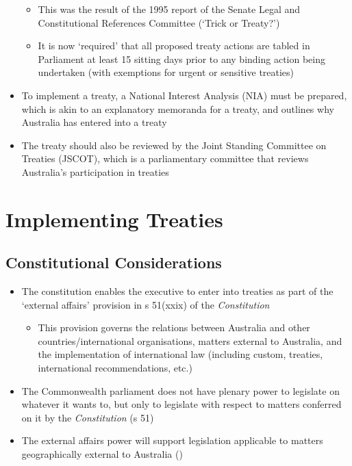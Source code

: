 \begin{itemize}
\begin{itemize}
        \item This was the result of the 1995 report of the Senate Legal and Constitutional References Committee (`Trick or Treaty?')
        \item It is now `required' that all proposed treaty actions are tabled in Parliament at least 15 sitting days prior to any binding action being undertaken (with exemptions for urgent or sensitive treaties)
    \end{itemize}
    \item To implement a treaty, a National Interest Analysis (NIA) must be prepared, which is akin to an explanatory memoranda for a treaty, and outlines why Australia has entered into a treaty
    \item The treaty should also be reviewed by the Joint Standing Committee on Treaties (JSCOT), which is a parliamentary committee that reviews Australia's participation in treaties
\end{itemize}

\section{Implementing Treaties}
\subsection{Constitutional Considerations}
\begin{itemize}
    \item The constitution enables the executive to enter into treaties as part of the `external affairs' provision in s 51(xxix) of the \textit{Constitution}
    \begin{itemize}
        \item This provision governs the relations between Australia and other countries/international organisations, matters external to Australia, and the implementation of international law (including custom, treaties, international recommendations, etc.)
    \end{itemize}
    \item The Commonwealth parliament does not have plenary power to legislate on whatever it wants to, but only to legislate with respect to matters conferred on it by the \textit{Constitution} (s 51)
    \item The external affairs power will support legislation applicable to matters geographically external to Australia ()
\end{itemize}

